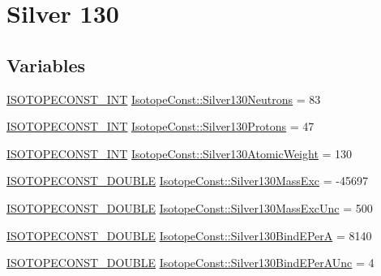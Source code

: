 \hypertarget{group___isotope_const-_silver-_ag130}{}\section{Silver 130}
\label{group___isotope_const-_silver-_ag130}
\subsection*{Variables}
\begin{DoxyCompactItemize}
\item 
\mbox{\hyperlink{group___isotope_const-_macros_ga5f18360b3e99483a35c32d789e62621c}{I\+S\+O\+T\+O\+P\+E\+C\+O\+N\+S\+T\+\_\+\+I\+NT}} \mbox{\hyperlink{group___isotope_const-_silver-_ag130_ga900c863d04dded4398e83f89e2ee9bca}{Isotope\+Const\+::\+Silver130\+Neutrons}} = 83
\item 
\mbox{\hyperlink{group___isotope_const-_macros_ga5f18360b3e99483a35c32d789e62621c}{I\+S\+O\+T\+O\+P\+E\+C\+O\+N\+S\+T\+\_\+\+I\+NT}} \mbox{\hyperlink{group___isotope_const-_silver-_ag130_gaaaaceaac1d24875aa15b36acd4f4a268}{Isotope\+Const\+::\+Silver130\+Protons}} = 47
\item 
\mbox{\hyperlink{group___isotope_const-_macros_ga5f18360b3e99483a35c32d789e62621c}{I\+S\+O\+T\+O\+P\+E\+C\+O\+N\+S\+T\+\_\+\+I\+NT}} \mbox{\hyperlink{group___isotope_const-_silver-_ag130_gae29b6a7e05c0c60724b890da9b0f4593}{Isotope\+Const\+::\+Silver130\+Atomic\+Weight}} = 130
\item 
\mbox{\hyperlink{group___isotope_const-_macros_ga8f45a7272ce02c0b4c65c44636ed719a}{I\+S\+O\+T\+O\+P\+E\+C\+O\+N\+S\+T\+\_\+\+D\+O\+U\+B\+LE}} \mbox{\hyperlink{group___isotope_const-_silver-_ag130_ga441cc46505f3f221349f8935ce81633b}{Isotope\+Const\+::\+Silver130\+Mass\+Exc}} = -\/45697
\item 
\mbox{\hyperlink{group___isotope_const-_macros_ga8f45a7272ce02c0b4c65c44636ed719a}{I\+S\+O\+T\+O\+P\+E\+C\+O\+N\+S\+T\+\_\+\+D\+O\+U\+B\+LE}} \mbox{\hyperlink{group___isotope_const-_silver-_ag130_ga9243ea149d2e2181426bb71d0a160ebd}{Isotope\+Const\+::\+Silver130\+Mass\+Exc\+Unc}} = 500
\item 
\mbox{\hyperlink{group___isotope_const-_macros_ga8f45a7272ce02c0b4c65c44636ed719a}{I\+S\+O\+T\+O\+P\+E\+C\+O\+N\+S\+T\+\_\+\+D\+O\+U\+B\+LE}} \mbox{\hyperlink{group___isotope_const-_silver-_ag130_ga54ec14846bc65e5b5957b33256a5b30d}{Isotope\+Const\+::\+Silver130\+Bind\+E\+PerA}} = 8140
\item 
\mbox{\hyperlink{group___isotope_const-_macros_ga8f45a7272ce02c0b4c65c44636ed719a}{I\+S\+O\+T\+O\+P\+E\+C\+O\+N\+S\+T\+\_\+\+D\+O\+U\+B\+LE}} \mbox{\hyperlink{group___isotope_const-_silver-_ag130_gabb47e404ade50e95be3502fe74cb744b}{Isotope\+Const\+::\+Silver130\+Bind\+E\+Per\+A\+Unc}} = 4

\end{DoxyCompactItemize}

